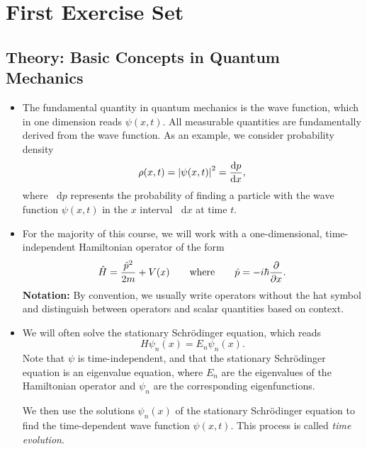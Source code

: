 \documentclass[11pt, a4paper]{article}
\newcommand{\diff}{\mathop{}\!\mathrm{d}} %
\newcommand{\eqtext}[1]{\qquad \text{#1} \qquad}
\newcommand{\Schro}{Schr\"{o}dinger\xspace}
\newcommand{\Ham}{Hamiltonian\xspace}
\renewcommand{\op}[1]{\hat{#1}} %
\newcommand{\p}{\psi}  %
\begin{document}
\newpage

\tableofcontents

\newpage

\section{First Exercise Set}

\subsection{Theory: Basic Concepts in Quantum Mechanics}
\begin{itemize}
	\item The fundamental quantity in quantum mechanics is the wave function, which in one dimension reads $ \psi(x, t) $. All measurable quantities are fundamentally derived from the wave function. As an example, we consider probability density
	\begin{equation*}
		\rho(x, t) = \abs{\psi(x, t)}^{2} = \dv{p}{x},
	\end{equation*}
	where $ \diff p $ represents the probability of finding a particle with the wave function $ \psi(x, t) $ in the $ x $ interval $ \diff x $ at time $ t $. 
		
    \item For the majority of this course, we will work with a one-dimensional, time-independent \Ham operator of the form
	\begin{equation*}
		\op{H} = \frac{\op{p}^{2}}{2m} + V(x) \eqtext{where} \op{p} = - i\hbar \pdv{}{x}.
	\end{equation*}
	\textbf{Notation:} By convention, we usually write operators without the hat symbol and distinguish between operators and scalar quantities based on context.
	
	\item We will often solve the stationary \Schro equation, which reads
	\begin{equation*}
		H\psi_{n}(x) = E_{n}\psi_{n}(x).
	\end{equation*}
    Note that $ \p $ is time-independent, and that the stationary \Schro equation is an eigenvalue equation, where $ E_{n} $ are the eigenvalues of the Hamiltonian operator and $ \psi_{n} $ are the corresponding eigenfunctions.
	
	We then use the solutions $ \psi_{n}(x) $ of the stationary \Schro equation to find the time-dependent wave function $ \psi(x, t) $. This process is called \textit{time evolution}. 
	

\end{itemize}
\end{document}
